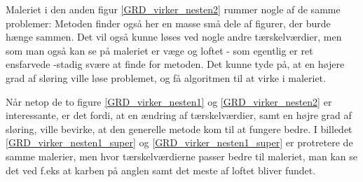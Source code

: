 Maleriet i den anden figur \ref{GRD_virker_nesten2} rummer nogle af de
samme problemer: Metoden finder også her en masse små dele af figurer,
der burde hænge sammen. Det vil også kunne løses ved nogle andre
tærskelværdier, men som man også kan se på maleriet er væge og loftet -
som egentlig er ret ensfarvede -stadig svære at finde for metoden. Det
kunne tyde på, at en højere grad af sløring ville løse problemet, og få
algoritmen til at virke i maleriet.

Når netop de to figure \ref{GRD_virker_nesten1} og
\ref{GRD_virker_nesten2} er interessante, er det fordi, at en ændring af
tærskelværdier, samt en højre grad af sløring, ville bevirke, at den
generelle metode kom til at fungere bedre. I billedet
\ref{GRD_virker_nesten1_super} og \ref{GRD_virker_nesten1_super} er
protretere de samme malerier, men hvor tærskelværdierne passer bedre til
maleriet, man kan se det ved f.eks at karben på anglen samt det meste af
loftet bliver fundet.

\clearpage

